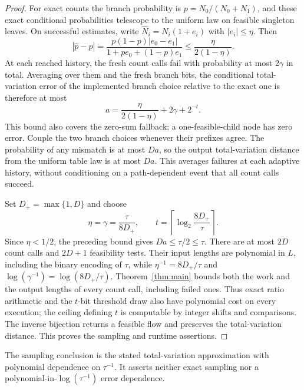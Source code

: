 \begin{proof}
For exact counts the branch probability is $p=N_0/(N_0+N_1)$, and
these exact conditional probabilities telescope to the uniform law on
feasible singleton leaves. On successful estimates, write
$\widehat N_i=N_i(1+e_i)$ with $|e_i|\le\eta$. Then
\[
 |\widehat p-p|=\frac{p(1-p)|e_0-e_1|}{1+pe_0+(1-p)e_1}
       \le\frac{\eta}{2(1-\eta)}.
\]
At each reached history, the fresh count calls fail with probability at
most $2\gamma$ in total. Averaging over them and the fresh branch bits,
the conditional total-variation error of the implemented branch choice
relative to the exact one is therefore at most
\[
 a=\frac{\eta}{2(1-\eta)}+2\gamma+2^{-t}.
\]
This bound also covers the zero-sum fallback; a one-feasible-child node
has zero error. Couple the two branch choices whenever their prefixes
agree. The probability of any mismatch is at most $Da$, so the output
total-variation distance from the uniform table law is at most $Da$.
This averages failures at each adaptive history, without conditioning
on a path-dependent event that all count calls succeed.

Set $D_+=\max\{1,D\}$ and choose
\[
 \eta=\gamma=\frac{\tau}{8D_+},\qquad
 t=\left\lceil\log_2\frac{8D_+}{\tau}\right\rceil.
\]
Since $\eta<1/2$, the preceding bound gives $Da\le\tau/2\le\tau$.
There are at most $2D$ count calls and $2D+1$ feasibility tests. Their
input lengths are polynomial in $L$, including the binary encoding of
$\tau$, while $\eta^{-1}=8D_+/\tau$ and
$\log(\gamma^{-1})=\log(8D_+/\tau)$. Theorem~\ref{thm:main} bounds both
the work and the output lengths of every count call, including failed
ones. Thus exact ratio arithmetic and the $t$-bit threshold draw also
have polynomial cost on every execution; the ceiling defining $t$ is
computable by integer shifts and comparisons. The inverse bijection
returns a feasible flow and preserves the total-variation distance.
This proves the sampling and runtime assertions.
\end{proof}

The sampling conclusion is the stated total-variation approximation
with polynomial dependence on $\tau^{-1}$. It asserts neither exact
sampling nor a polynomial-in-$\log(\tau^{-1})$ error dependence.
